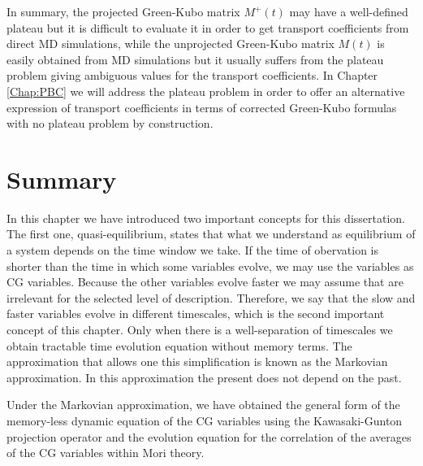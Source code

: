 \documentclass[b5paper,openright,10pt]{book}
\newcommand{\Note}[1]{{\bf \color{red}#1}}    %
\begin{document}
In  summary,  the projected  Green-Kubo  matrix  $M^+(t)$ may  have  a
well-defined plateau  but it is difficult  to evaluate it in  order to
get  transport  coefficients from  direct  MD  simulations, while  the
unprojected  Green-Kubo  matrix  $M(t)$  is easily  obtained  from  MD
simulations but  it usually  suffers from  the plateau  problem giving
ambiguous values for the transport coefficients.  In Chapter \ref{Chap:PBC} we will address the plateau problem in order to offer an alternative expression of transport coefficients in terms of corrected Green-Kubo formulas with no plateau problem by construction.

\section{Summary}
In this chapter we have introduced two important concepts for this dissertation. The first one, quasi-equilibrium, states that what we understand as equilibrium of a system depends on the time window we take. If the time of obervation is shorter than the time in which some variables evolve, we may use the variables as CG variables. 
Because the other variables evolve faster we may assume that are irrelevant for the selected level of description. 
Therefore, we say that the slow and faster variables evolve in different timescales, which is the second important concept of this chapter. 
Only when there is a well-separation of timescales we obtain tractable time evolution equation without memory terms. 
The approximation that allows one this simplification is known as the Markovian approximation. In this approximation the present does not depend on the past. 


Under the Markovian approximation, we have obtained the general form of the memory-less dynamic equation of the CG variables using the Kawasaki-Gunton projection operator and the evolution equation for the correlation of the averages of the CG variables within Mori theory. 


\end{document}
